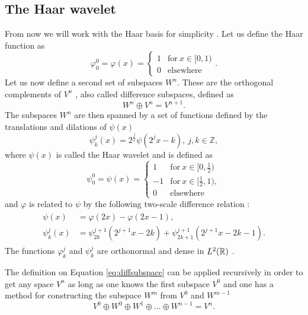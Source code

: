 \documentclass[../master_thesis.tex]{subfiles}
\begin{document}
\subsection{The Haar wavelet}
From now we will work with the Haar basis for simplicity \cite{Beylkin:MRA}.
Let us define the Haar function \cite{Schneider:2007} as
\begin{equation}
  \varphi^0_0 = \varphi(x) =
  \begin{cases}
  1 & \text{for} \ x\in [0,1)\\
  0 & \text{elsewhere}
\end{cases}.
\end{equation}
Let us now define a second set of subspaces $W^n$. These are the orthogonal complements of $V^n$ \cite{Alpert1993}, also called difference subspaces,
defined as \cite{Beylkin:MRA, Sorland, Alpert1993}
\begin{equation}
  W^n \oplus V^n = V^{n + 1}. \label{eq:diffsubspace}
\end{equation}
The subspaces $W^n$ are then spanned by a set of functions defined by the translations and
dilations of $\psi(x)$
\begin{equation}
  \psi_k^j(x) = 2^{\frac{j}{2}}\psi(2^jx - k),\  j,k \in \mathbb{Z} \label{eq:haarwavelet},
\end{equation}
where $\psi(x)$ is called the Haar wavelet \cite{Schneider:2007} and is defined as
\begin{equation}
  \psi^0_0 = \psi(x) =
  \begin{cases}
  1 & \text{for} \ x\in [0,\frac{1}{2})\\
  -1 & \text{for}\ x\in [\frac{1}{2}, 1),\\
  0 & \text{elsewhere}
\end{cases}
\end{equation}
and $\varphi$ is related to $\psi$ by the following two-scale difference relation \cite{Beylkin:MRA, Schneider:2007, Sorland}:
\begin{align}
  \begin{split}\label{eq:2scalewavelet}
    \psi(x) &= \varphi(2x) - \varphi(2x - 1),\\
    \psi^j_k(x) &= \psi^{j+1}_{2k}(2^{j+1}x - 2k) + \psi^{j+1}_{2k+1}(2^{j+1}x - 2k - 1).
  \end{split}
\end{align}
The functions $\varphi^j_k$ and $\psi^j_k$ are orthonormal
and dense in $L^2(\mathbb{R})$ \cite{Beylkin:MRA, Sorland, SRJensen:2014}.

The definition on Equation \ref{eq:diffsubspace} can be applied recursively in order to
get any space $V^n$ as long as one knows the first subspace $V^0$ and one has a method for constructing the
subspace $W^m$ from $V^0$ and $W^{m-1}$
\begin{equation}
    V^0 \oplus W^0 \oplus W^1 \oplus ... \oplus W^{n-1}  = V^n. \label{eq:recursivespace}
\end{equation}
\end{document}
